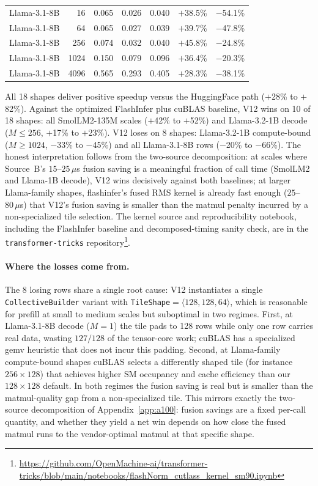 \documentclass{article}
\begin{document}
\begin{table}[h!]
\begin{tabular}{l r r r r r r}
Llama-3.1-8B & 16   & 0.065 & 0.026 & 0.040 & $+$38.5\% & $-$54.1\% \\
Llama-3.1-8B & 64   & 0.065 & 0.027 & 0.039 & $+$39.7\% & $-$47.8\% \\
Llama-3.1-8B & 256  & 0.074 & 0.032 & 0.040 & $+$45.8\% & $-$24.8\% \\
Llama-3.1-8B & 1024 & 0.150 & 0.079 & 0.096 & $+$36.4\% & $-$20.3\% \\
Llama-3.1-8B & 4096 & 0.565 & 0.293 & 0.405 & $+$28.3\% & $-$38.1\% \\
\hline
\end{tabular}
\end{table}

All 18 shapes deliver positive speedup versus the HuggingFace path ($+$28\% to $+$82\%). Against the optimized FlashInfer plus cuBLAS baseline, V12 wins on 10 of 18 shapes: all SmolLM2-135M scales ($+$42\% to $+$52\%) and Llama-3.2-1B decode ($M \leq 256$, $+$17\% to $+$23\%). V12 loses on 8 shapes: Llama-3.2-1B compute-bound ($M \geq 1024$, $-$33\% to $-$45\%) and all Llama-3.1-8B rows ($-$20\% to $-$66\%). The honest interpretation follows from the two-source decomposition: at scales where Source~B's $15$--$25\,\mu$s fusion saving is a meaningful fraction of call time (SmolLM2 and Llama-1B decode), V12 wins decisively against both baselines; at larger Llama-family shapes, flashinfer's fused RMS kernel is already fast enough ($25$--$80\,\mu$s) that V12's fusion saving is smaller than the matmul penalty incurred by a non-specialized tile selection.
The kernel source and reproducibility notebook, including the FlashInfer baseline and decomposed-timing sanity check, are in the \texttt{transformer-tricks} repository\footnote{\url{https://github.com/OpenMachine-ai/transformer-tricks/blob/main/notebooks/flashNorm\_cutlass\_kernel\_sm90.ipynb}}.

\paragraph{Where the losses come from.} The 8 losing rows share a single root cause: V12 instantiates a single \texttt{CollectiveBuilder} variant with \texttt{TileShape}$=\langle 128, 128, 64 \rangle$, which is reasonable for prefill at small to medium scales but suboptimal in two regimes. First, at Llama-3.1-8B decode ($M{=}1$) the tile pads to 128 rows while only one row carries real data, wasting $127/128$ of the tensor-core work; cuBLAS has a specialized gemv heuristic that does not incur this padding. Second, at Llama-family compute-bound shapes cuBLAS selects a differently shaped tile (for instance $256{\times}128$) that achieves higher SM occupancy and cache efficiency than our $128{\times}128$ default. In both regimes the fusion saving is real but is smaller than the matmul-quality gap from a non-specialized tile. This mirrors exactly the two-source decomposition of Appendix~\ref{app:a100}: fusion savings are a fixed per-call quantity, and whether they yield a net win depends on how close the fused matmul runs to the vendor-optimal matmul at that specific shape.
\end{document}
